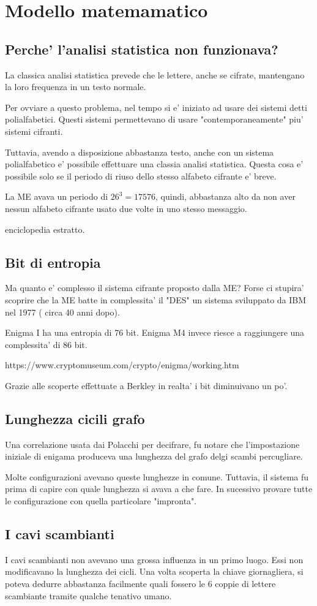 \section{Modello matemamatico}

\subsection{Perche' l'analisi statistica non funzionava?}
La classica analisi statistica prevede che le lettere, anche se cifrate,
mantengano la loro frequenza in un testo normale.

Per ovviare a questo problema, nel tempo si e' iniziato ad usare dei sistemi detti
polialfabetici.
Questi sistemi permettevano di usare "contemporaneamente" piu' sistemi cifranti.

Tuttavia, avendo a disposizione abbastanza testo, anche con un sistema polialfabetico
e' possibile effettuare una classia analisi statistica.
Questa cosa e' possibile solo se il periodo di riuso dello stesso alfabeto
cifrante e' breve.

La ME avava un periodo di $26^{3} = 17576$, quindi, abbastanza alto da non aver
nessun alfabeto cifrante usato due volte in uno stesso messaggio.

enciclopedia estratto.

\subsection{Bit di entropia}
Ma quanto e' complesso il sistema cifrante proposto dalla ME?
Forse ci stupira' scoprire che la ME batte in complessita' il "DES"
un sistema sviluppato da IBM nel 1977 ( circa 40 anni dopo).

Enigma I ha una entropia di 76 bit.
Enigma M4 invece riesce a raggiungere una complessita' di 86 bit.

https://www.cryptomuseum.com/crypto/enigma/working.htm

Grazie alle scoperte effettuate a Berkley in realta' i bit diminuivano un po'.

\subsection{Lunghezza cicili grafo}
Una correlazione usata dai Polacchi per decifrare, fu notare che
l'impostazione iniziale di enigama produceva una lunghezza del grafo delgi scambi percugliare.

Molte configurazioni avevano queste lunghezze in comune.
Tuttavia, il sistema fu prima di capire con quale lunghezza si avava a che fare.
In sucessivo provare tutte le configurazione con quella particolare "impronta".

\subsection{I cavi scambianti}
I cavi scambianti non avevano una grossa influenza in un primo luogo.
Essi non modificavano la lunghezza dei cicli.
Una volta scoperta la chiave giornagliera, si poteva dedurre abbastanza
facilmente quali fossero le 6 coppie di lettere scambiante tramite qualche
tenativo umano.


%
